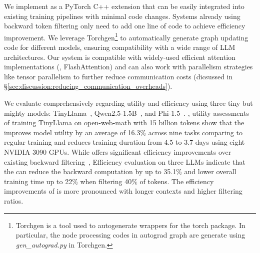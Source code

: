 We implement \solution as a PyTorch C++ extension that can be easily integrated into existing training pipelines with minimal code changes. Systems already using backward token filtering only need to add one line of code to achieve efficiency improvement. We leverage Torchgen\footnote{Torchgen is a tool used to autogenerate wrappers for the torch package. In particular, the node processing codes in autograd graph are generate using \textit{gen\_autograd.py} in Torchgen.} to automatically generate graph updating code for different models, ensuring compatibility with a wide range of LLM architectures. Our system is compatible with widely-used efficient attention implementations (\eg, FlashAttention) and can also work with parallelism strategies like tensor parallelism to further reduce communication costs (dicsussed in \S\ref{sec:discussion:reducing_communication_overheads}).

We evaluate \solution comprehensively regarding utility and efficiency using three tiny but mighty models: TinyLlama~\cite{tinyllama}, Qwen2.5-1.5B~\cite{qwen2}, and Phi-1.5~\cite{Phi1.5}.
, utility assessments of training TinyLlama on open-web-math with 15 billion tokens show that the \solution improves model utility by an average of 16.3\% across nine tasks comparing to regular training and reduces training duration from 4.5 to 3.7 days using eight NVIDIA 3090 GPUs. 
While \solution offers significant efficiency improvements over existing backward filtering~\cite{RHO}, 
Efficiency evaluation on three LLMs indicate that the \solution can reduce the backward computation by up to 35.1\% and lower overall training time up to 22\% when filtering 40\% of tokens. The efficiency improvements of \solution is more pronounced with longer contexts and higher filtering ratios. 
